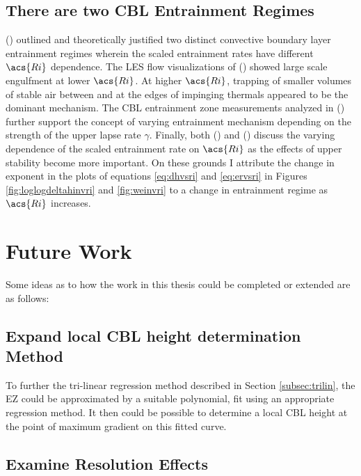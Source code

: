 \subsection{There are two \acs{CBL} Entrainment Regimes}

\citeauthor{Turner86} (\citeyear{Turner86}) outlined and theoretically justified two distinct convective boundary layer entrainment regimes wherein the scaled entrainment rates have different $\acs{Ri}$ dependence. The \acs{LES} flow visualizations of \citeauthor{SullMoengStev} (\citeyear{SullMoengStev}) showed large scale engulfment at lower $\acs{Ri}$.  At higher $\acs{Ri}$, trapping of smaller volumes of stable air between and at the edges of impinging thermals appeared to be the dominant mechanism. The \acs{CBL} entrainment zone measurements analyzed in \citeauthor{Traum11} (\citeyear{Traum11}) further support the concept of varying entrainment mechanism depending on the strength of the upper lapse rate $\gamma$.  Finally, both \citeauthor{FedConzMir04} (\citeyear{FedConzMir04})  and \citeauthor{GarciaMellado} (\citeyear{GarciaMellado}) discuss the varying dependence of the scaled entrainment rate on $\acs{Ri}$ as the effects of upper stability become more important.  On these grounds I attribute the change in exponent in the plots of equations \ref{eq:dhvsri} and \ref{eq:ervsri} in Figures \ref{fig:loglogdeltahinvri} and \ref{fig:weinvri} to a change in entrainment regime as $\acs{Ri}$ increases.   


\section{Future Work}

Some ideas as to how the work in this thesis could be completed or extended are as follows:

\subsection{Expand local \acs{CBL} height determination Method}

To further the tri-linear regression method described in Section \ref{subsec:trilin}, the \acs{EZ} could be approximated by a suitable polynomial, fit using an appropriate regression method.  It then could be possible to determine a local \acs{CBL} height at the point of maximum gradient on this fitted curve.\\

\subsection{Examine Resolution Effects}

